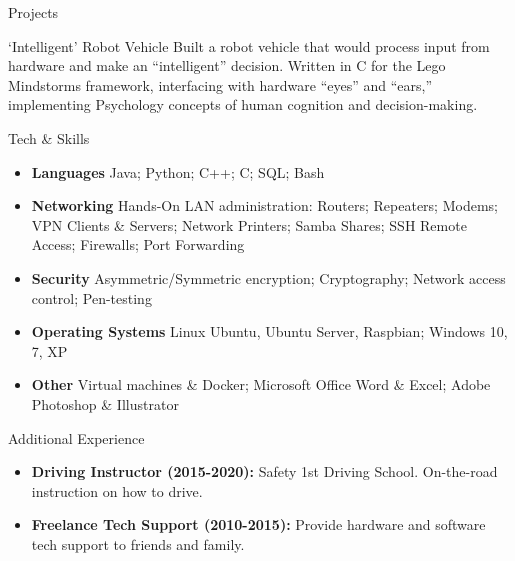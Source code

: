 \documentclass[]{mcdowellcv}
\begin{document}
\begin{cvsection}{Projects}
		\begin{cvsubsection}{‘Intelligent’ Robot Vehicle}{}{}		
			Built a robot vehicle that would process input from hardware and make an “intelligent” decision.  
			Written in C for the Lego Mindstorms framework, interfacing with hardware “eyes” and “ears,” implementing Psychology concepts of human cognition and decision-making. 
		\end{cvsubsection}
	\end{cvsection}
	
	\begin{cvsection}{Tech \& Skills}
		\begin{cvsubsection}{}{}{}
			\begin{itemize}
				\item \textbf{Languages} Java; Python; C++; C; SQL; Bash
				\item \textbf{Networking} Hands-On LAN administration: Routers; Repeaters; Modems; VPN Clients \& Servers; Network Printers; Samba Shares; SSH Remote Access; Firewalls; Port Forwarding 
				\item \textbf{Security} Asymmetric/Symmetric encryption; Cryptography; Network access control; Pen-testing
				\item \textbf{Operating Systems} Linux {Ubuntu, Ubuntu Server, Raspbian}; Windows {10, 7, XP}
				\item \textbf{Other} Virtual machines \& Docker; Microsoft Office Word \& Excel; Adobe Photoshop \& Illustrator
			\end{itemize}
		\end{cvsubsection}
	\end{cvsection}
	
	\begin{cvsection}{Additional Experience}
		\begin{cvsubsection}{}{}{}	
			\begin{itemize}
				\item \textbf{Driving Instructor (2015-2020):} Safety 1st Driving School. On-the-road instruction on how to drive.
				\item \textbf{Freelance Tech Support (2010-2015):} Provide hardware and software tech support to friends and family.
			\end{itemize}
		\end{cvsubsection}
	\end{cvsection}
	
\end{document}
